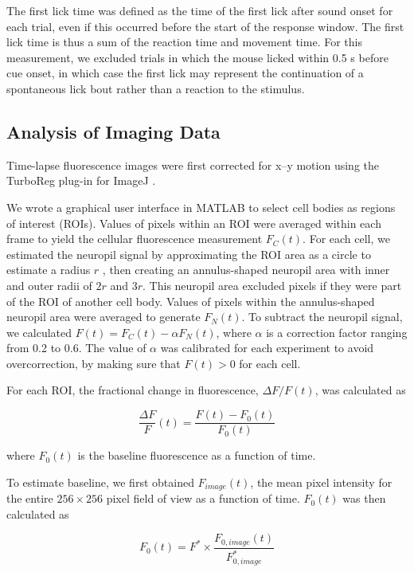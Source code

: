 The first lick time was defined as the time of the first lick after sound onset for each trial, even if this occurred before the start of the response window. The first lick time is thus a sum of the reaction time and movement time. For this measurement, we excluded trials in which the mouse licked within 0.5 s before cue onset, in which case the first lick may represent the continuation of a spontaneous lick bout rather than a reaction to the stimulus.

\subsection*{Analysis of Imaging Data}
Time-lapse fluorescence images were first corrected for x–y motion using the TurboReg plug-in \citep{thevenaz1998pyramid} for ImageJ \citep{schneider2012nih}. 

We wrote a graphical user interface in MATLAB to select cell bodies as regions of interest (ROIs). Values of pixels within an ROI were averaged within each frame to yield the cellular fluorescence measurement $F_C(t)$. For each cell, we estimated the neuropil signal by approximating the ROI area as a circle to estimate a radius $r$ \citep{peron2015cellular}, then creating an annulus-shaped neuropil area with inner and outer radii of $2r$ and $3r$. This neuropil area excluded pixels if they were part of the ROI of another cell body. Values of pixels within the annulus-shaped neuropil area were averaged to generate $F_N(t)$. To subtract the neuropil signal, we calculated $F(t) = F_C(t) - \alpha F_N(t)$, where $\alpha$ is a correction factor ranging from 0.2 to 0.6. The value of $\alpha$ was calibrated for each experiment to avoid overcorrection, by making sure that $F(t) > 0$ for each cell. 

For each ROI, the fractional change in fluorescence, $\Delta F/F (t)$, was calculated as

\begin{equation*}
    \frac{\Delta F}{F}(t) = \frac{F(t)-F_0(t)}{F_0(t)}
\end{equation*}

\noindent where $F_0(t)$ is the baseline fluorescence as a function of time. 

To estimate baseline, we first obtained $F_{image}(t)$, the mean pixel intensity for the entire $256 \times 256$ pixel field of view as a function of time. $F_0(t)$ was then calculated as

\begin{equation*}
    F_0(t) = F^{*} \times \frac{F_{0,image}(t)}{F^*_{0,image}}
\end{equation*}

